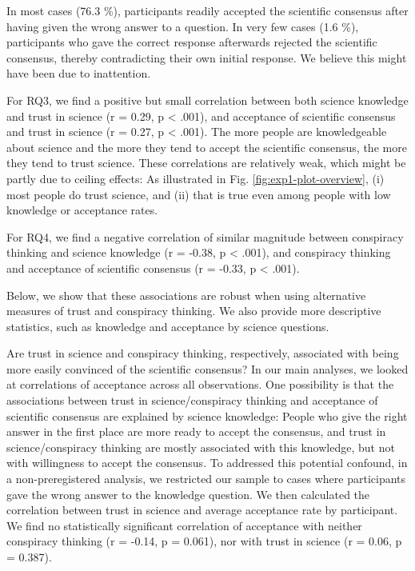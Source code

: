 \documentclass[
  doc,floatsintext]{apa6}
\begin{document}
In most cases (76.3 \%), participants readily accepted the scientific consensus after having given the wrong answer to a question. In very few cases (1.6 \%), participants who gave the correct response afterwards rejected the scientific consensus, thereby contradicting their own initial response. We believe this might have been due to inattention.

For RQ3, we find a positive but small correlation between both science knowledge and trust in science (r = 0.29, p \textless{} .001), and acceptance of scientific consensus and trust in science (r = 0.27, p \textless{} .001). The more people are knowledgeable about science and the more they tend to accept the scientific consensus, the more they tend to trust science. These correlations are relatively weak, which might be partly due to ceiling effects: As illustrated in Fig. \ref{fig:exp1-plot-overview}, (i) most people do trust science, and (ii) that is true even among people with low knowledge or acceptance rates.

For RQ4, we find a negative correlation of similar magnitude between conspiracy thinking and science knowledge (r = -0.38, p \textless{} .001), and conspiracy thinking and acceptance of scientific consensus (r = -0.33, p \textless{} .001).

Below, we show that these associations are robust when using alternative measures of trust and conspiracy thinking. We also provide more descriptive statistics, such as knowledge and acceptance by science questions.

Are trust in science and conspiracy thinking, respectively, associated with being more easily convinced of the scientific consensus? In our main analyses, we looked at correlations of acceptance across all observations. One possibility is that the associations between trust in science/conspiracy thinking and acceptance of scientific consensus are explained by science knowledge: People who give the right answer in the first place are more ready to accept the consensus, and trust in science/conspiracy thinking are mostly associated with this knowledge, but not with willingness to accept the consensus. To addressed this potential confound, in a non-preregistered analysis, we restricted our sample to cases where participants gave the wrong answer to the knowledge question. We then calculated the correlation between trust in science and average acceptance rate by participant. We find no statistically significant correlation of acceptance with neither conspiracy thinking (r = -0.14, p = 0.061), nor with trust in science (r = 0.06, p = 0.387).
\end{document}
